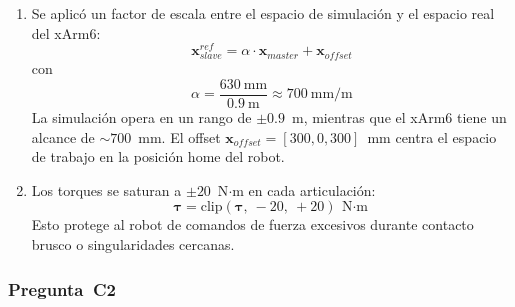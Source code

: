 \documentclass[journal,10pt,twoside]{IEEEtran}
\begin{document}
\begin{enumerate}[label=(\alph*)]
\begin{lstlisting}[caption={Ciclo de control del robot Esclavo},
                   label={lst:slave}]
    # 4. Leer fuerza del sensor HX711 via UDP
    Fe = net.Fe   # actualizado por hilo ESP32

    # 5. Enviar fuerza al maestro
    net.send_force(Fe, in_contact)

    time.sleep(0.01)
\end{lstlisting}

\item Se aplicó un factor de escala entre el espacio de simulación
y el espacio real del xArm6:
\[
\bm{x}_{slave}^{ref} = \alpha \cdot \bm{x}_{master} + \bm{x}_{offset}
\]
con
\[
\alpha = \frac{630\ \text{mm}}{0.9\ \text{m}} \approx 700\ \text{mm/m}
\]
La simulación opera en un rango de $\pm 0.9$~m, mientras que el xArm6
tiene un alcance de $\sim 700$~mm. El offset $\bm{x}_{offset} = [300, 0, 300]$~mm
centra el espacio de trabajo en la posición home del robot.

\item Los torques se saturan a $\pm 20$~N$\cdot$m en cada articulación:
\[
\bm{\tau} = \text{clip}(\bm{\tau},\ -20,\ +20)\ \text{N$\cdot$m}
\]
Esto protege al robot de comandos de fuerza excesivos durante contacto
brusco o singularidades cercanas.

\end{enumerate}

\subsubsection*{Pregunta~C2}
\end{document}
